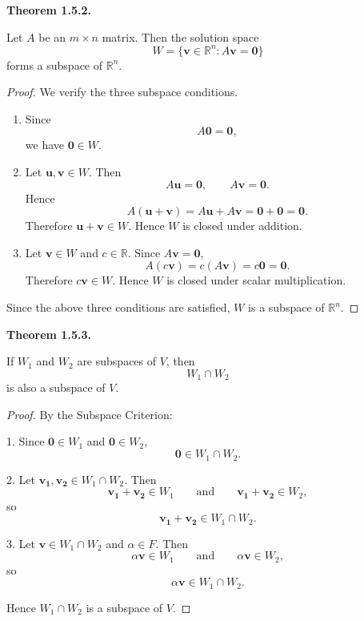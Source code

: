 \documentclass[12pt]{article}
\begin{document}
\textbf{Theorem 1.5.2.}

Let $A$ be an $m\times n$ matrix. Then the solution space
\[
W=\{\mathbf{v}\in\mathbb{R}^n: A\mathbf{v}=\mathbf{0}\}
\]
forms a subspace of $\mathbb{R}^n$.

\begin{proof}
We verify the three subspace conditions.

\begin{enumerate}
    \item Since
    \[
    A\mathbf{0} = \mathbf{0},
    \]
    we have $\mathbf{0}\in W$.

    \bigskip

    \item Let $\mathbf{u,v}\in W$. Then
    \[
    A\mathbf{u} = \mathbf{0},\qquad A\mathbf{v} = \mathbf{0}.
    \]
    Hence
    \[
    A\mathbf{(u + v)} = A\mathbf{u} + A\mathbf{v} = \mathbf{0 + 0} = \mathbf{0}.
    \]
    Therefore $\mathbf{u + v}\in W$. Hence $W$ is closed under addition.

    \bigskip

    \item Let $\mathbf{v}\in W$ and $c\in\mathbb{R}$.
    Since $A\mathbf{v} = \mathbf{0}$,
    \[
    A(c\mathbf{v}) = c(A\mathbf{v}) = c\mathbf{0} = \mathbf{0}.
    \]
    Therefore $c\mathbf{v}\in W$. Hence $W$ is closed under scalar multiplication.

    \bigskip

\end{enumerate}

Since the above three conditions are satisfied, $W$ is a subspace of $\mathbb{R}^n$.
\end{proof}

\textbf{Theorem 1.5.3.} 

If $W_1$ and $W_2$ are subspaces of $V$, then
\[ 
W_1\cap W_2
\]
is also a subspace of $V$.

\begin{proof}
By the Subspace Criterion:

\bigskip

1. Since $\mathbf{0}\in W_1$ and $\mathbf{0}\in W_2$,
\[
\mathbf{0}\in W_1\cap W_2.
\]

\bigskip

2. Let $\mathbf{v_1,v_2}\in W_1\cap W_2$. Then
\[
\mathbf{v_1 + v_2}\in W_1 \qquad\text{and}\qquad \mathbf{v_1 + v_2}\in W_2,
\]
so
\[
\mathbf{v_1 + v_2}\in W_1\cap W_2.
\]

\bigskip

3. Let $\mathbf{v}\in W_1\cap W_2$ and $\alpha\in F$. Then
\[
\alpha \mathbf{v}\in W_1 \qquad\text{and}\qquad \alpha \mathbf{v}\in W_2,
\]
so
\[
\alpha \mathbf{v}\in W_1\cap W_2.
\]

\bigskip

Hence $W_1\cap W_2$ is a subspace of $V$.

\end{proof}
\end{document}
